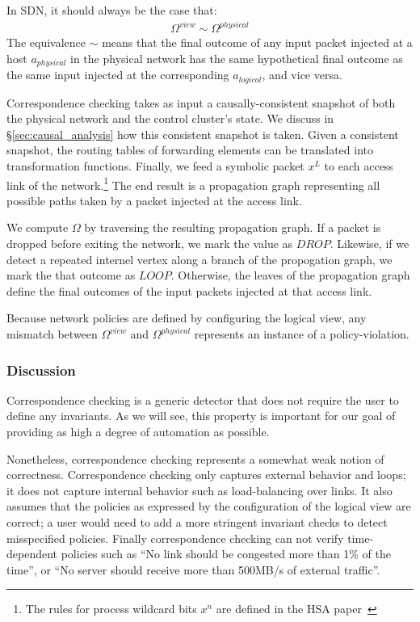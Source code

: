 In SDN, it should always be the case that:
\begin{align*}
\Omega^{view} \sim \Omega^{physical}
\end{align*}
The equivalence $\sim$ means that the final outcome of any input packet
injected at a host $a_{physical}$ in the physical network has the same hypothetical final outcome as
the same input injected at the corresponding $a_{logical}$, and vice versa.

Correspondence checking takes as input a causally-consistent
snapshot of both the physical network and the
control cluster's state. We discuss in \S\ref{sec:causal_analysis} how this consistent snapshot
is taken. Given a consistent
snapshot, the routing
tables of forwarding elements can be translated into transformation functions.
Finally, we feed a symbolic packet $x^L$ to each access link of the
network.\footnote{The rules for process wildcard bits $x^n$ are defined in
the HSA paper~\cite{hsa}} The end result is a propagation graph representing all possible paths taken by a packet injected
at the access link.

We compute $\Omega$ by traversing the resulting propagation graph. If a packet
is dropped before exiting the network, we mark the value as $DROP$. Likewise,
if we detect a repeated internel vertex along a branch of the propogation graph, we mark the
that outcome as $LOOP$. Otherwise, 
the leaves of the propagation graph define the final outcomes of the input
packets injected at that access link.

Because network policies are defined by
configuring the logical view, any mismatch between $\Omega^{view}$ and $\Omega^{physical}$
represents an instance of a policy-violation.

\subsubsection{Discussion}

Correspondence checking is a generic detector that does not require the user
to define any invariants. As we will see, this property is important for our
goal of providing as high a degree of automation as possible.

Nonetheless, correspondence checking represents a somewhat weak notion of
correctness. Correspondence checking only captures external behavior and
loops; it does not capture internal behavior such as load-balancing
over links. It also assumes that the policies as expressed by the
configuration of the logical view are correct; a user would need to add a more 
stringent invariant checks to detect misspecified policies.
Finally correspondence checking can not verify
time-dependent policies such as ``No link should be congested more than 1\% of
the time'', or ``No server should receive more than 500MB/s of external traffic''.

